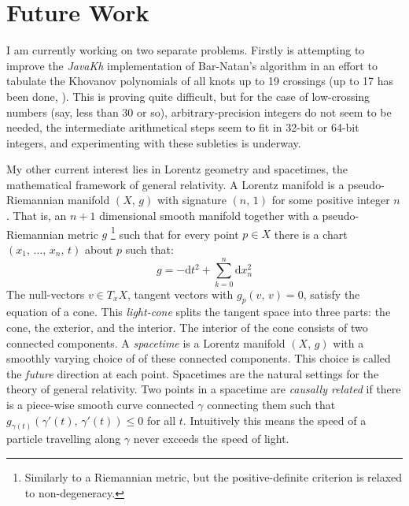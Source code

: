 \documentclass{article}
\theoremstyle{plain}
\begin{document}
    \section{Future Work}
        I am currently working on two separate problems. Firstly is attempting
        to improve the \textit{JavaKh} implementation of Bar-Natan's
        algorithm \cite{BarNatan2006FASTKH} in an effort to tabulate the
        Khovanov polynomials of all knots up to 19 crossings (up to 17 has
        been done, \cite{KhovanovData}). This is proving quite difficult, but
        for the case of low-crossing numbers (say, less than 30 or so),
        arbitrary-precision integers do not seem to be needed, the intermediate
        arithmetical steps seem to fit in 32-bit or 64-bit integers, and
        experimenting with these subleties is underway.
        \par\hfill\par
        My other current interest lies in Lorentz geometry and spacetimes,
        the mathematical framework of general relativity. A Lorentz manifold
        is a pseudo-Riemannian manifold $(X,\,g)$ with signature $(n,\,1)$ for
        some positive integer $n$. That is, an $n+1$ dimensional smooth
        manifold together with a pseudo-Riemannian metric $g$%
        \footnote{
            Similarly to a Riemannian metric, but the positive-definite
            criterion is relaxed to non-degeneracy.
        }
        such that for every point $p\in{X}$ there is a chart
        $(x_{1},\,\dots,\,x_{n},\,t)$ about $p$ such that:
        \begin{equation}
            g=-\textrm{d}t^{2}+\sum_{k=0}^{n}\textrm{d}x_{n}^{2}
        \end{equation}
        The null-vectors $v\in{T}_{x}X$, tangent vectors with
        $g_{p}(v,\,v)=0$, satisfy the equation of a cone. This
        \textit{light-cone} splits the tangent space into three parts: the
        cone, the exterior, and the interior. The interior of the cone consists
        of two connected components. A \textit{spacetime} is a Lorentz manifold
        $(X,\,g)$ with a smoothly varying choice of of these connected
        components. This choice is called the \textit{future} direction at
        each point. Spacetimes are the natural settings for the theory of
        general relativity. Two points in a spacetime are
        \textit{causally related} if there is a piece-wise smooth curve
        connected $\gamma$ connecting them such that
        $g_{\gamma(t)}(\gamma'(t),\,\gamma'(t))\leq{0}$ for all $t$.
        Intuitively this means the speed of a particle travelling along $\gamma$
        never exceeds the speed of light.
\end{document}
